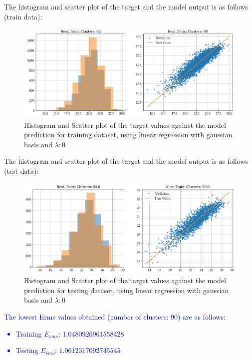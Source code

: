 \documentclass[12pt,a4paper]{article}
\newcommand{\noi}{\noindent}
\begin{document}
\noi
The histogram and scatter plot of the target and the model output is as follows (train data):
\begin{figure}[H]
     \centering
     \includegraphics[scale=0.49]{images/t3_d3/no_reg/T_min_nclu_90.png}
     \caption{Histogram and Scatter plot of the target values against the model prediction for training dataset, using linear regression with gaussian basis and $\lambda: 0$}
\end{figure}

\noi
The histogram and scatter plot of the target and the model output is as follows (test data):
\begin{figure}[H]
    \centering
    \includegraphics[scale=0.49]{images/t3_d3/no_reg/T_min_test.png}
    \caption{Histogram and Scatter plot of the target values against the model prediction for testing dataset, using linear regression with gaussian basis and $\lambda: 0$}
\end{figure}

\noi
\textcolor{blue}{
The lowest Erms values obtained (number of clusters: 90) are as follows:
\begin{itemize}
    \itemsep0em
    \item Training $E_{rms}$: $1.0480926961558428$
    \item Testing $E_{rms}$: $1.0612317092745545$
\end{itemize}
}
\end{document}
